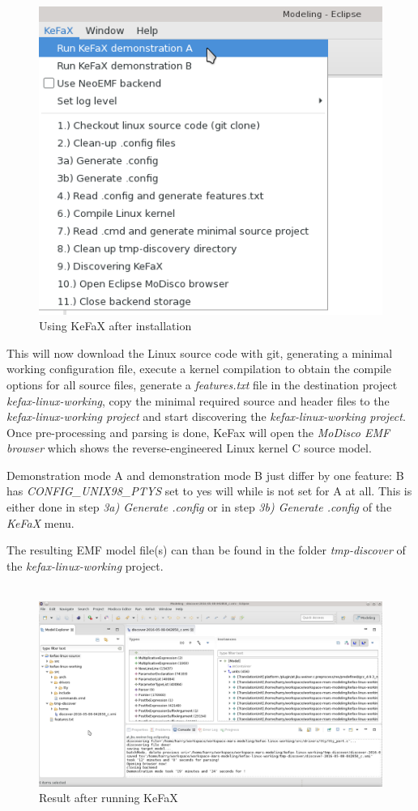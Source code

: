  \begin{figure}[ht]
  \centering
  \includegraphics[scale=0.5]{images/kefax-menu-0002}
  \caption{Using KeFaX after installation}
  \label{fig:KefaxMenu}
  \end{figure}
This will now download the Linux source code with git, 
generating a minimal working configuration file, 
execute a kernel compilation to obtain the compile 
options for all source files, generate a {\it features.txt}
file in the destination project {\it kefax-linux-working}, 
copy the minimal required source and header files to the 
{\it kefax-linux-working project} and start discovering the {\it kefax-linux-working project}.
Once pre-processing and parsing is done, 
KeFax will open the {\it MoDisco EMF browser} which shows the 
reverse-engineered Linux kernel C source model. 

Demonstration mode A and demonstration mode B just differ by one feature: 
B has {\it CONFIG\_UNIX98\_PTYS} set to yes will while is not set for A at all. 
This is either done in step {\it 3a) Generate .config} or in step {\it 3b) Generate .config} of the {\it KeFaX} menu. 

The resulting EMF model file(s) can than be found in the folder {\it tmp-discover} of the {\it kefax-linux-working} project. 
\\ \ \\
\begin{figure}[ht]
  \centering
  \includegraphics[scale=0.5]{images/discoverer-2015-05-08}
  \caption{Result after running KeFaX}
  \label{fig:discoverer20150508}
\end{figure}

